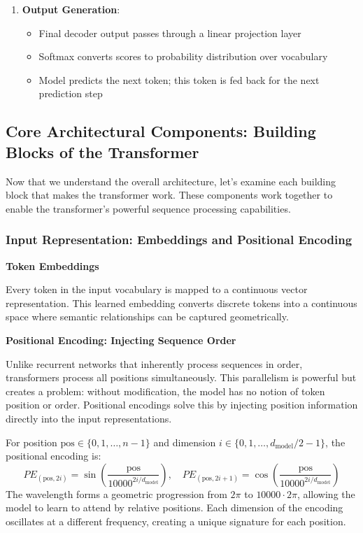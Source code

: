 \begin{enumerate}[leftmargin=*]
  \item \textbf{Output Generation}:
    \begin{itemize}
      \item Final decoder output passes through a linear projection layer
      \item Softmax converts scores to probability distribution over vocabulary
      \item Model predicts the next token; this token is fed back for the next prediction step
    \end{itemize}
\end{enumerate}

\subsection{Core Architectural Components: Building Blocks of the Transformer}

Now that we understand the overall architecture, let's examine each building block that makes the transformer work. These components work together to enable the transformer's powerful sequence processing capabilities.

\subsubsection{Input Representation: Embeddings and Positional Encoding}

\textbf{Token Embeddings}

Every token in the input vocabulary is mapped to a continuous vector representation. This learned embedding converts discrete tokens into a continuous space where semantic relationships can be captured geometrically.

\textbf{Positional Encoding: Injecting Sequence Order}

Unlike recurrent networks that inherently process sequences in order, transformers process all positions simultaneously. This parallelism is powerful but creates a problem: without modification, the model has no notion of token position or order. Positional encodings solve this by injecting position information directly into the input representations.

\begin{definition}
  For position $\text{pos} \in \{0, 1, \ldots, n-1\}$ and dimension $i \in \{0, 1, \ldots, d_{\text{model}}/2-1\}$, the positional encoding is:
  \begin{equation}
    PE_{(\text{pos}, 2i)} = \sin\left(\frac{\text{pos}}{10000^{2i/d_{\text{model}}}}\right), \quad
    PE_{(\text{pos}, 2i+1)} = \cos\left(\frac{\text{pos}}{10000^{2i/d_{\text{model}}}}\right)
  \end{equation}
  The wavelength forms a geometric progression from $2\pi$ to $10000 \cdot 2\pi$, allowing the model to learn to attend by relative positions. Each dimension of the encoding oscillates at a different frequency, creating a unique signature for each position.
\end{definition}



